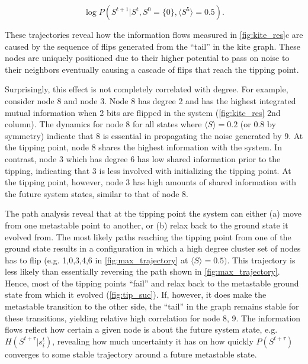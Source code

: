 \documentclass[a4paper, 11pt, twocolumn]{article}
\begin{document}
\begin{equation*}
\label{eq:max_trajectory}
\log P(S^{t + 1}|S^{t}, S^0 = \{0\}, \langle S^5 \rangle = 0.5).
\end{equation*}


These trajectories reveal how the information flows measured
in  \cref{fig:kite_res}{c}  are  caused  by  the
sequence  of flips  generated from  the ``tail''  in the  kite
graph.  These nodes  are  uniquely positioned  due to  their
higher  potential  to  pass  on  noise  to  their  neighbors
eventually causing a cascade of flips that reach the tipping
point.

Surprisingly, this effect is  not completely correlated with
degree. For example, consider node 8  and node 3. Node 8 has
degree 2  and has the highest  integrated mutual information
when 2  bits are flipped in  the system (\cref{fig:kite_res}
2nd column).  The dynamics for  node 8 for all  states where
\(\langle S  \rangle =  0.2\) (or  0.8 by symmetry)  indicate that  8 is
essential in  propagating the noise  generated by 9.  At the
tipping point,  node 8  shares the highest  information with
the system. In  contrast, node 3 which has degree  6 has low
shared information  prior to the tipping,  indicating that 3
is less involved with initializing the tipping point. At the
tipping point,  however, node 3  has high amounts  of shared
information with  the future system states,  similar to that
of node 8.

The  path analysis  reveal  that at  the  tipping point  the
system  can either  (a) move  from one  metastable point  to
another, or  (b) relax back  to the ground state  it evolved
from. The most likely paths  reaching the tipping point from
one of the ground state  results in a configuration in which
a  high  degree cluster  set  of  nodes  has to  flip  (e.g.
1,0,3,4,6 in \cref{fig:max_trajectory} at  \(\langle S \rangle = 0.5)\).
This trajectory  is less  likely than  essentially reversing
the path shown in  \cref{fig:max_trajectory}. Hence, most of
the tipping points  ``fail'' and relax back  to the metastable
ground state from which it evolved (\cref{fig:tip_suc}). If,
however, it does make the metastable transition to the other
side,  the ``tail''  in  the graph  remains  stable for  these
transitions,  yielding relative  high  correlation for  node
8, 9. The information flows reflect how certain a given node
is about  the future  system state,  e.g. \(H(S^{t + \tau}  | s_i^{t})\),
revealing  how  much  uncertainty  it  has  on  how  quickly
\(P(S^{t + \tau})\)  converges to  some  stable  trajectory around  a
future metastable state.
\end{document}
